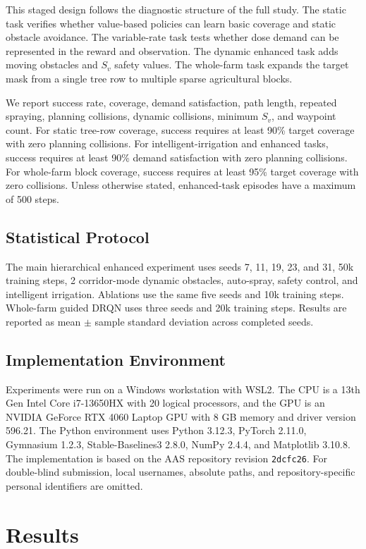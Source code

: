 \documentclass[conference,10pt]{IEEEtran}
\begin{document}
This staged design follows the diagnostic structure of the full study. The static task verifies whether value-based policies can learn basic coverage and static obstacle avoidance. The variable-rate task tests whether dose demand can be represented in the reward and observation. The dynamic enhanced task adds moving obstacles and $S_v$ safety values. The whole-farm task expands the target mask from a single tree row to multiple sparse agricultural blocks.

We report success rate, coverage, demand satisfaction, path length, repeated spraying, planning collisions, dynamic collisions, minimum $S_v$, and waypoint count. For static tree-row coverage, success requires at least 90\% target coverage with zero planning collisions. For intelligent-irrigation and enhanced tasks, success requires at least 90\% demand satisfaction with zero planning collisions. For whole-farm block coverage, success requires at least 95\% target coverage with zero collisions. Unless otherwise stated, enhanced-task episodes have a maximum of 500 steps.

\subsection{Statistical Protocol}
The main hierarchical enhanced experiment uses seeds 7, 11, 19, 23, and 31, 50k training steps, 2 corridor-mode dynamic obstacles, auto-spray, safety control, and intelligent irrigation. Ablations use the same five seeds and 10k training steps. Whole-farm guided DRQN uses three seeds and 20k training steps. Results are reported as mean $\pm$ sample standard deviation across completed seeds.

\subsection{Implementation Environment}
Experiments were run on a Windows workstation with WSL2. The CPU is a 13th Gen Intel Core i7-13650HX with 20 logical processors, and the GPU is an NVIDIA GeForce RTX 4060 Laptop GPU with 8 GB memory and driver version 596.21. The Python environment uses Python 3.12.3, PyTorch 2.11.0, Gymnasium 1.2.3, Stable-Baselines3 2.8.0, NumPy 2.4.4, and Matplotlib 3.10.8. The implementation is based on the AAS repository revision \texttt{2dcfc26}. For double-blind submission, local usernames, absolute paths, and repository-specific personal identifiers are omitted.

\section{Results}
\end{document}
